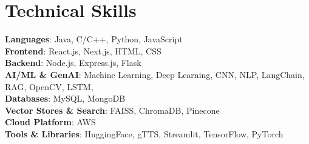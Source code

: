 \documentclass[letterpaper,10pt]{article}
\begin{document}
\section{Technical Skills}
\begin{itemize}[leftmargin=0.15in, label={}]
    \small{
     \item{
     \textbf{Languages}{: Java, C/C++, Python, JavaScript} \\
    \textbf{Frontend}{: React.js, Next.js, HTML, CSS}\\
    \textbf{Backend}{: Node.js, Express.js, Flask}\\
    \textbf{AI/ML \& GenAI}{: Machine Learning, Deep Learning, CNN, NLP, LangChain, RAG, OpenCV, LSTM, }\\
     \textbf{Databases}{: MySQL, MongoDB} \\
     \textbf{Vector Stores \& Search}{: FAISS, ChromaDB, Pinecone } \\
     \textbf{Cloud Platform}{: AWS} \\
     \textbf{Tools \& Libraries}{: HuggingFace, gTTS, Streamlit, TensorFlow, PyTorch}\\
     }}
\end{itemize}






\end{document}
